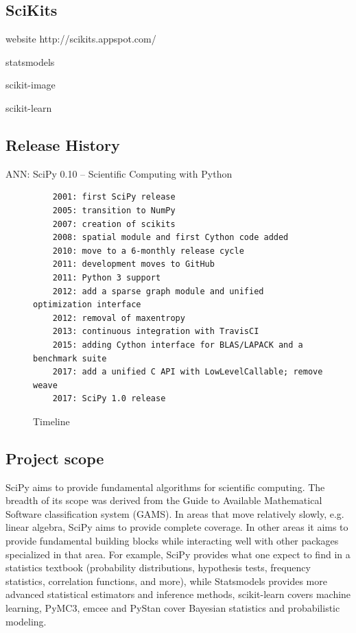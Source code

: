 \documentclass[fleqn,10pt]{wlscirep}
\begin{document}
\subsection*{SciKits}



website http://scikits.appspot.com/

statsmodels

scikit-image

scikit-learn
\subsection*{Release History}


ANN: SciPy 0.10 -- Scientific Computing with Python

\begin{figure}
\begin{verbatim}
    2001: first SciPy release
    2005: transition to NumPy
    2007: creation of scikits
    2008: spatial module and first Cython code added
    2010: move to a 6-monthly release cycle
    2011: development moves to GitHub
    2011: Python 3 support
    2012: add a sparse graph module and unified optimization interface
    2012: removal of maxentropy
    2013: continuous integration with TravisCI
    2015: adding Cython interface for BLAS/LAPACK and a benchmark suite
    2017: add a unified C API with LowLevelCallable; remove weave
    2017: SciPy 1.0 release
\end{verbatim}
\caption{Timeline}
\end{figure}


\subsection*{Project scope}

SciPy aims to provide fundamental algorithms for scientific computing. The
breadth of its scope was derived from the Guide to Available Mathematical
Software classification system (GAMS\cite{boisvert1991guide}). In areas
that move relatively slowly, e.g. linear algebra, SciPy aims to provide
complete coverage. In other areas it aims to provide fundamental building
blocks while interacting well with other packages specialized in that area.
For example, SciPy provides what one expect to find in a
statistics textbook (probability distributions, hypothesis tests, frequency
statistics, correlation functions, and more), while Statsmodels provides
more advanced statistical estimators and inference methods, scikit-learn
covers machine learning, PyMC3, emcee and PyStan cover Bayesian statistics
and probabilistic modeling.
\end{document}
